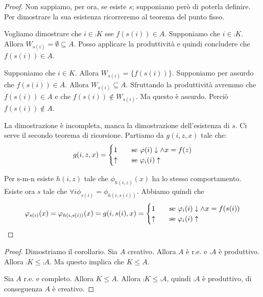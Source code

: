 \begin{proof}
    Non sappiamo, per ora, se esiste $s$; supponiamo però di poterla definire. Per dimostrare la
    sua esistenza ricorreremo al teorema del punto fisso.

    Vogliamo dimostrare che $i \in \comp{K}$ sse $f(s(i)) \in A$. Supponiamo che $i \in \comp{K}$.
    Allora $W_{s(i)} = \emptyset \subseteq A$. Posso applicare la produttività e quindi concludere
    che $f(s(i)) \in A$.

    Supponiamo che $i \in K$. Allora $W_{s(i)} = \{f(s(i))\}$. Supponiamo per assurdo che $f(s(i)) \in A$.
    Allora $W_{s(i)} \subseteq A$. Sfruttando la produttività avremmo che $f(s(i)) \in A$ e che
    $f(s(i)) \notin W_{s(i)}$. Ma questo è assurdo. Perciò $f(s(i)) \notin A$.

    La dimostrazione è incompleta, manca la dimostrazione dell'esistenza di $s$. Ci serve il secondo
    teorema di ricorsione. Partiamo da $g(i,z,x)$ tale che:
    \begin{equation*}
        g(i,z,x) =
        \begin{cases}
            1 \quad &\text{se $\varphi(i) \downarrow \land x = f(z)$} \\
            \uparrow \quad &\text{se $\varphi_{i}(i) \uparrow$}
        \end{cases}
    \end{equation*}
    
    Per s-m-n esiste $h(i,z)$ tale che $\phi_{h(i,z)}(x)$ ha lo stesso comportamento. Esiste ora $s$ tale che
    $\forall i \phi_{s(i)} = \phi_{h(i,s(i))}$. Abbiamo quindi che
    \begin{equation*}
        \varphi_{s(i)}(x) = \varphi_{h(i,s(i))}(x) = g(i,s(i),x) =
        \begin{cases}
            1 \quad &\text{se $\varphi_{i}(i) \downarrow \land x = f(s(i))$} \\
            \uparrow \quad &\text{se $\varphi_{i}(i) \uparrow$}
        \end{cases}
    \end{equation*}
\end{proof}

\begin{proof}
    Dimostriamo il corollario. Sia $A$ creativo. Allora $A$ è r.e. e $\comp{A}$ è produttivo. Allora
    $\comp{K} \leq \comp{A}$. Ma questo implica che $K \leq A$.

    Sia $A$ r.e. e completo. Allora $K \leq A$. Allora $\comp{K} \leq \comp{A}$, quindi $\comp{A}$ è
    produttivo, di conseguenza $A$ è creativo.
\end{proof}

